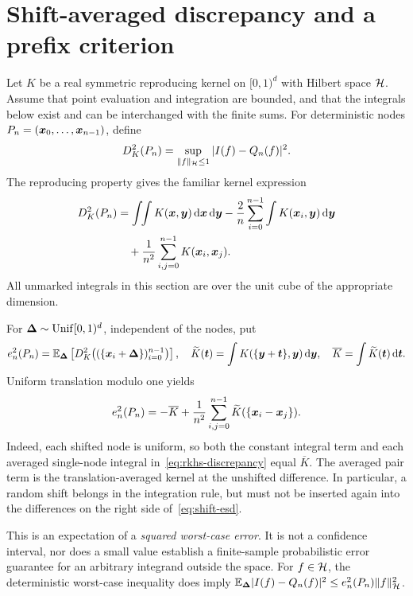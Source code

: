 \section{Shift-averaged discrepancy and a prefix criterion}\label{sec:framework}
Let $K$ be a real symmetric reproducing kernel on $[0,1)^d$ with Hilbert
space $\mathcal H$. Assume that point evaluation and integration are bounded,
and that the integrals below exist and can be interchanged with the finite
sums. For deterministic nodes $P_n=(\boldsymbol{x}_0,\ldots,\boldsymbol{x}_{n-1})$, define
\[
 D_K^2(P_n)=\sup_{\|f\|_{\mathcal H}\le1}|I(f)-Q_n(f)|^2.
\]
The reproducing property gives the familiar kernel expression
\begin{align}\label{eq:rkhs-discrepancy}
 D_K^2(P_n)
 &=\int\!\!\int K(\boldsymbol{x},\boldsymbol y)\,\mathrm{d}\boldsymbol{x}\,\mathrm{d}\boldsymbol y
 -\frac2n\sum_{i=0}^{n-1}\int K(\boldsymbol{x}_i,\boldsymbol y)\,\mathrm{d}\boldsymbol y\notag\\
 &\quad+\frac1{n^2}\sum_{i,j=0}^{n-1}K(\boldsymbol{x}_i,\boldsymbol{x}_j).
\end{align}
All unmarked integrals in this section are over the unit cube of the
appropriate dimension.

For $\boldsymbol{\Delta}\sim\mathrm{Unif}[0,1)^d$, independent of the nodes, put
\[
 e_n^2(P_n)=\mathbb{E}_{\boldsymbol{\Delta}}\left[D_K^2\bigl(
 (\{\boldsymbol{x}_i+\boldsymbol{\Delta}\})_{i=0}^{n-1}\bigr)\right],
 \quad
 \widetilde K(\boldsymbol t)=\int K(\{\boldsymbol y+\boldsymbol t\},
 \boldsymbol y)\,\mathrm{d}\boldsymbol y,
 \quad \overline K=\int\widetilde K(\boldsymbol t)\,\mathrm{d}\boldsymbol t.
\]
Uniform translation modulo one yields
\begin{equation}\label{eq:shift-esd}
 e_n^2(P_n)=-\overline K+
 \frac1{n^2}\sum_{i,j=0}^{n-1}
 \widetilde K(\{\boldsymbol{x}_i-\boldsymbol{x}_j\}).
\end{equation}
Indeed, each shifted node is uniform, so both the constant integral term
and each averaged single-node integral in~\eqref{eq:rkhs-discrepancy}
equal $\overline K$. The averaged pair term is the translation-averaged
kernel at the unshifted difference. In particular, a random shift belongs
in the integration rule, but must not be inserted again into the differences
on the right side of~\eqref{eq:shift-esd}.

This is an expectation of a \emph{squared worst-case error}. It is not a
confidence interval, nor does a small value establish a finite-sample
probabilistic error guarantee for an arbitrary integrand outside the space.
For $f\in\mathcal H$, the deterministic worst-case inequality does imply
$\mathbb{E}_{\boldsymbol{\Delta}}|I(f)-Q_n(f)|^2\le e_n^2(P_n)\|f\|_{\mathcal H}^2$.

